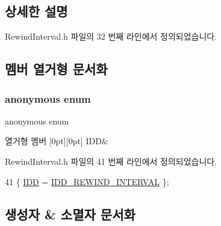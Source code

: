 \subsection{상세한 설명}


Rewind\+Interval.\+h 파일의 32 번째 라인에서 정의되었습니다.



\subsection{멤버 열거형 문서화}
\mbox{\label{class_rewind_interval_aea74dcd9cfdb01eab907a1e6a633786f}} 
\subsubsection{\texorpdfstring{anonymous enum}{anonymous enum}}
{\footnotesize\ttfamily anonymous enum}

\begin{DoxyEnumFields}{열거형 멤버}
[0pt][0pt]{}\mbox{\label{class_rewind_interval_aea74dcd9cfdb01eab907a1e6a633786fa422d7fb0e0b5b81c5e1681c417ea1963}} 
I\+DD&\\
\hline

\end{DoxyEnumFields}


Rewind\+Interval.\+h 파일의 41 번째 라인에서 정의되었습니다.


\begin{DoxyCode}
41 \{ \mbox{\hyperlink{class_rewind_interval_aea74dcd9cfdb01eab907a1e6a633786fa422d7fb0e0b5b81c5e1681c417ea1963}{IDD}} = \mbox{\hyperlink{resource_8h_a2ee735534c18b61ce38dade678d686a2}{IDD\_REWIND\_INTERVAL}} \};
\end{DoxyCode}


\subsection{생성자 \& 소멸자 문서화}
\mbox{\label{class_rewind_interval_abf63f08752f596ac0fa23b5cc75705ef}} 
